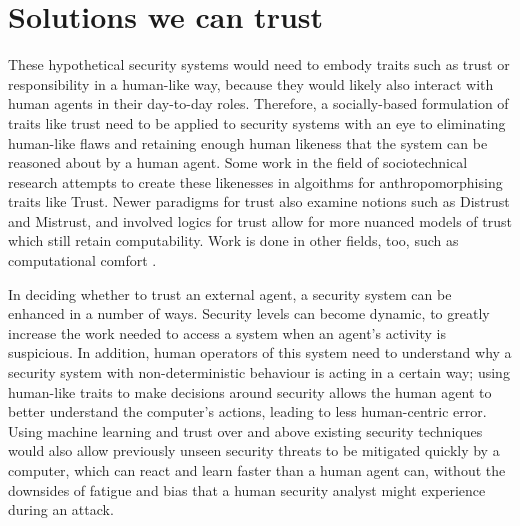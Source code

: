 \documentclass{tufte-handout}
\begin{document}
\section{Solutions we can trust}
These hypothetical security systems would need to embody traits such as trust or responsibility in a human-like way, because they would likely also interact with human agents in their day-to-day roles. Therefore, a socially-based formulation of traits like trust need to be applied to security systems with an eye to eliminating human-like flaws and retaining enough human likeness that the system can be reasoned about by a human agent. Some work in the field of sociotechnical research attempts to create these likenesses in algoithms for anthropomorphising traits like Trust\cite{Marsh1994}. Newer paradigms for trust also examine notions such as Distrust and Mistrust, and involved logics for trust \cite{Kramdi} allow for more nuanced models of trust which still retain computability. Work is done in other fields, too, such as computational comfort \cite{MarshComfort}.\par

In deciding whether to trust an external agent, a security system can be enhanced in a number of ways. Security levels can become dynamic, to greatly increase the work needed to access a system when an agent's activity is suspicious. In addition, human operators of this system need to understand why a security system with non-deterministic behaviour is acting in a certain way; using human-like traits to make decisions around security allows the human agent to better understand the computer's actions, leading to less human-centric error. Using machine learning and trust over and above existing security techniques would also allow previously unseen security threats to be mitigated quickly by a computer, which can react and learn faster than a human agent can, without the downsides of fatigue and bias that a human security analyst might experience during an attack.\par
\end{document}
